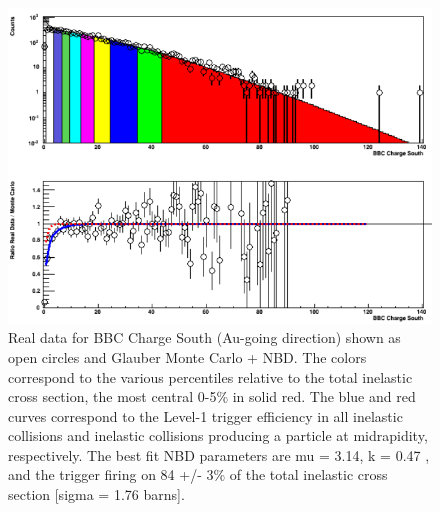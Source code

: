\begin{figure}[!h]
\begin{center}
\includegraphics[width=0.65\linewidth]{figs/centrality_determination.png}
\caption{Real data for BBC Charge South (Au-going direction) shown as open circles and Glauber Monte Carlo + NBD. The colors correspond to the various
percentiles relative to the total inelastic \pau cross section, the most central 0-5$\%$ in solid red. The blue and red curves correspond to the Level-1 trigger
efficiency in all inelastic collisions and inelastic collisions producing a particle at midrapidity, respectively. The best fit NBD parameters are mu = 3.14, k = 0.47
, and the trigger firing on 84 +/- 3$\%$ of the total inelastic cross section [sigma = 1.76 barns].}
\end{center}
\end{figure}

